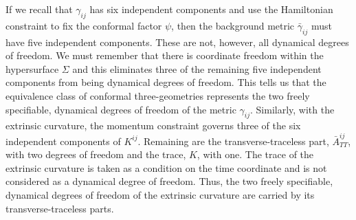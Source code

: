 If we recall that $\gamma_{ij}$ has six independent components and use the
Hamiltonian constraint to fix the conformal factor $\psi$, then the background
metric $\bar\gamma_{ij}$ must have five independent components.  These are not,
however, all dynamical degrees of freedom.  We must remember that there is
coordinate freedom within the hypersurface $\Sigma$ and this eliminates three of
the remaining five independent components from being dynamical degrees of
freedom.  This tells us that the equivalence class of conformal three-geometries
represents the two freely specifiable, dynamical degrees of freedom of the metric
$\gamma_{ij}$.  Similarly, with the extrinsic curvature, the momentum constraint
governs three of the six independent components of $K^{ij}$.  Remaining are the
transverse-traceless part,  $\bar A_{\scriptscriptstyle TT}^{ij}$, with two
degrees of freedom and the trace, $K$, with one.  The trace of the extrinsic
curvature is taken as a condition on the time coordinate and is not considered as
a dynamical degree of freedom.  Thus, the two freely specifiable, dynamical
degrees of freedom of the extrinsic curvature are carried by its
transverse-traceless parts.
\vfill
\eject